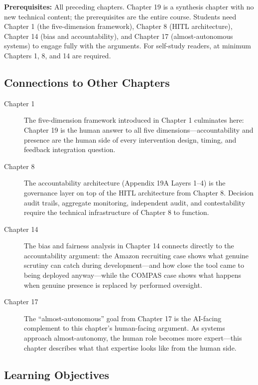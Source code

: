 \textbf{Prerequisites:} All preceding chapters. Chapter 19 is a synthesis chapter with no new technical content; the prerequisites are the entire course. Students need Chapter 1 (the five-dimension framework), Chapter 8 (HITL architecture), Chapter 14 (bias and accountability), and Chapter 17 (almost-autonomous systems) to engage fully with the arguments. For self-study readers, at minimum Chapters 1, 8, and 14 are required.

\subsection*{Connections to Other Chapters}

\begin{description}
    \item[Chapter 1] The five-dimension framework introduced in Chapter 1 culminates here: Chapter 19 is the human answer to all five dimensions---accountability and presence are the human side of every intervention design, timing, and feedback integration question.
    \item[Chapter 8] The accountability architecture (Appendix 19A Layers 1--4) is the governance layer on top of the HITL architecture from Chapter 8. Decision audit trails, aggregate monitoring, independent audit, and contestability require the technical infrastructure of Chapter 8 to function.
    \item[Chapter 14] The bias and fairness analysis in Chapter 14 connects directly to the accountability argument: the Amazon recruiting case shows what genuine scrutiny can catch during development---and how close the tool came to being deployed anyway---while the COMPAS case shows what happens when genuine presence is replaced by performed oversight.
    \item[Chapter 17] The ``almost-autonomous'' goal from Chapter 17 is the AI-facing complement to this chapter's human-facing argument. As systems approach almost-autonomy, the human role becomes more expert---this chapter describes what that expertise looks like from the human side.
\end{description}

\subsection*{Learning Objectives}


